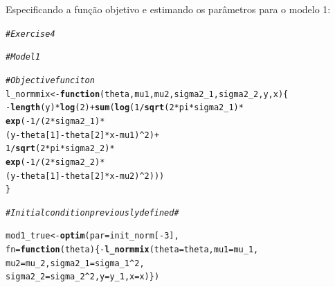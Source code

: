 \documentclass{homework}\usepackage[]{graphicx}\usepackage[]{color}
\makeatletter
\newcommand{\hlnum}[1]{\textcolor[rgb]{0.686,0.059,0.569}{#1}}%
\newcommand{\hlcom}[1]{\textcolor[rgb]{0.678,0.584,0.686}{\textit{#1}}}%
\newcommand{\hlopt}[1]{\textcolor[rgb]{0,0,0}{#1}}%
\newcommand{\hlstd}[1]{\textcolor[rgb]{0.345,0.345,0.345}{#1}}%
\newcommand{\hlkwa}[1]{\textcolor[rgb]{0.161,0.373,0.58}{\textbf{#1}}}%
\newcommand{\hlkwb}[1]{\textcolor[rgb]{0.69,0.353,0.396}{#1}}%
\newcommand{\hlkwc}[1]{\textcolor[rgb]{0.333,0.667,0.333}{#1}}%
\newcommand{\hlkwd}[1]{\textcolor[rgb]{0.737,0.353,0.396}{\textbf{#1}}}%
\newenvironment{kframe}{%
 \def\at@end@of@kframe{}%
 \ifinner\ifhmode%
  \def\at@end@of@kframe{\end{minipage}}%
  \begin{minipage}{\columnwidth}%
 \fi\fi%
 \def\FrameCommand##1{\hskip\@totalleftmargin \hskip-\fboxsep
 \colorbox{shadecolor}{##1}\hskip-\fboxsep
     \hskip-\linewidth \hskip-\@totalleftmargin \hskip\columnwidth}%
 \MakeFramed {\advance\hsize-\width
   \@totalleftmargin\z@ \linewidth\hsize
   \@setminipage}}%
 {\par\unskip\endMakeFramed%
 \at@end@of@kframe}
\newenvironment{knitrout}{}{} %
\makeatother
\begin{document}
\begin{enumerate}

Especificando a função objetivo e estimando os parâmetros para o modelo 1:

\begin{knitrout}
\color{fgcolor}\begin{kframe}
\begin{alltt}
\hlcom{# Exercise 4}

\hlcom{# Model 1}

\hlcom{# Objective funciton}
\hlstd{l_normmix} \hlkwb{<-} \hlkwa{function}\hlstd{(}\hlkwc{theta}\hlstd{,} \hlkwc{mu1}\hlstd{,} \hlkwc{mu2}\hlstd{,} \hlkwc{sigma2_1}\hlstd{,} \hlkwc{sigma2_2}\hlstd{,} \hlkwc{y}\hlstd{,} \hlkwc{x}\hlstd{)\{}
  \hlopt{-}\hlkwd{length}\hlstd{(y)}\hlopt{*}\hlkwd{log}\hlstd{(}\hlnum{2}\hlstd{)}\hlopt{+} \hlkwd{sum}\hlstd{(}\hlkwd{log}\hlstd{(}\hlnum{1}\hlopt{/}\hlkwd{sqrt}\hlstd{(}\hlnum{2}\hlopt{*}\hlstd{pi}\hlopt{*}\hlstd{sigma2_1)}\hlopt{*}
                               \hlkwd{exp}\hlstd{(}\hlopt{-}\hlnum{1}\hlopt{/}\hlstd{(}\hlnum{2}\hlopt{*}\hlstd{sigma2_1)}\hlopt{*}
                                     \hlstd{(y} \hlopt{-} \hlstd{theta[}\hlnum{1}\hlstd{]} \hlopt{-} \hlstd{theta[}\hlnum{2}\hlstd{]} \hlopt{*} \hlstd{x} \hlopt{-} \hlstd{mu1)}\hlopt{^}\hlnum{2}\hlstd{)} \hlopt{+}
                           \hlnum{1}\hlopt{/}\hlkwd{sqrt}\hlstd{(}\hlnum{2}\hlopt{*}\hlstd{pi}\hlopt{*}\hlstd{sigma2_2)}\hlopt{*}
                           \hlkwd{exp}\hlstd{(}\hlopt{-}\hlnum{1}\hlopt{/}\hlstd{(}\hlnum{2}\hlopt{*}\hlstd{sigma2_2)} \hlopt{*}
                                 \hlstd{(y} \hlopt{-} \hlstd{theta[}\hlnum{1}\hlstd{]} \hlopt{-} \hlstd{theta[}\hlnum{2}\hlstd{]} \hlopt{*} \hlstd{x} \hlopt{-} \hlstd{mu2)}\hlopt{^}\hlnum{2}\hlstd{)))}
\hlstd{\}}

\hlcom{# Initial condition previously defined #}

\hlstd{mod1_true} \hlkwb{<-} \hlkwd{optim}\hlstd{(}\hlkwc{par} \hlstd{= init_norm[}\hlopt{-}\hlnum{3}\hlstd{],}
      \hlkwc{fn} \hlstd{=} \hlkwa{function}\hlstd{(}\hlkwc{theta}\hlstd{)\{}\hlopt{-}\hlkwd{l_normmix}\hlstd{(}\hlkwc{theta} \hlstd{= theta,} \hlkwc{mu1} \hlstd{= mu_1,}
                                      \hlkwc{mu2} \hlstd{= mu_2,}\hlkwc{sigma2_1} \hlstd{= sigma_1}\hlopt{^}\hlnum{2}\hlstd{,}
                                      \hlkwc{sigma2_2} \hlstd{= sigma_2}\hlopt{^}\hlnum{2}\hlstd{,} \hlkwc{y} \hlstd{= y_1,} \hlkwc{x}\hlstd{=x)\})}
\end{alltt}
\end{kframe}
\end{knitrout}


\end{enumerate}
\end{document}
